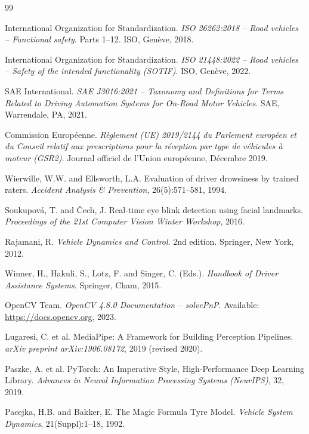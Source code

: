 \documentclass[12pt,a4paper]{report}
\begin{document}
\begin{thebibliography}{99}

International Organization for Standardization.
\textit{ISO 26262:2018 -- Road vehicles -- Functional safety}.
Parts 1--12. ISO, Gen\`eve, 2018.

International Organization for Standardization.
\textit{ISO 21448:2022 -- Road vehicles -- Safety of the intended functionality (SOTIF)}.
ISO, Gen\`eve, 2022.

SAE International.
\textit{SAE J3016:2021 -- Taxonomy and Definitions for Terms Related to Driving Automation Systems for On-Road Motor Vehicles}.
SAE, Warrendale, PA, 2021.

Commission Europ\'eenne.
\textit{R\`eglement (UE) 2019/2144 du Parlement europ\'een et du Conseil relatif aux prescriptions pour la r\'eception par type de v\'ehicules \`a moteur (GSR2)}.
Journal officiel de l'Union europ\'eenne, D\'ecembre 2019.

Wierwille, W.W. and Ellsworth, L.A.
Evaluation of driver drowsiness by trained raters.
\textit{Accident Analysis \& Prevention}, 26(5):571--581, 1994.

Soukupov\'a, T. and \v{C}ech, J.
Real-time eye blink detection using facial landmarks.
\textit{Proceedings of the 21st Computer Vision Winter Workshop}, 2016.

Rajamani, R.
\textit{Vehicle Dynamics and Control}.
2nd edition. Springer, New York, 2012.

Winner, H., Hakuli, S., Lotz, F. and Singer, C. (Eds.).
\textit{Handbook of Driver Assistance Systems}.
Springer, Cham, 2015.

OpenCV Team.
\textit{OpenCV 4.8.0 Documentation -- solvePnP}.
Available: \url{https://docs.opencv.org}, 2023.

Lugaresi, C. et al.
MediaPipe: A Framework for Building Perception Pipelines.
\textit{arXiv preprint arXiv:1906.08172}, 2019 (revised 2020).

Paszke, A. et al.
PyTorch: An Imperative Style, High-Performance Deep Learning Library.
\textit{Advances in Neural Information Processing Systems (NeurIPS)}, 32, 2019.

Pacejka, H.B. and Bakker, E.
The Magic Formula Tyre Model.
\textit{Vehicle System Dynamics}, 21(Suppl):1--18, 1992.


\end{thebibliography}
\end{document}
